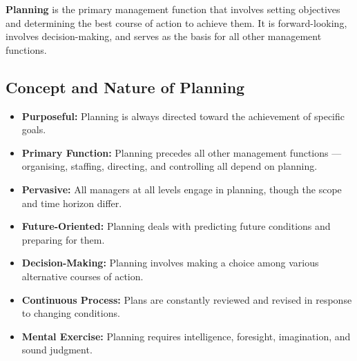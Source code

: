 \documentclass[12pt,a4paper]{article}
\begin{document}
\begin{tcolorbox}[defbox, title={\textbf{Planning --- Definition}}]
\textbf{Planning} is the primary management function that involves setting objectives and determining the best course of action to achieve them. It is forward-looking, involves decision-making, and serves as the basis for all other management functions.
\end{tcolorbox}

\subsection{Concept and Nature of Planning}
\begin{itemize}[leftmargin=*, itemsep=3pt]
  \item \textbf{Purposeful:} Planning is always directed toward the achievement of specific goals.
  \item \textbf{Primary Function:} Planning precedes all other management functions --- organising, staffing, directing, and controlling all depend on planning.
  \item \textbf{Pervasive:} All managers at all levels engage in planning, though the scope and time horizon differ.
  \item \textbf{Future-Oriented:} Planning deals with predicting future conditions and preparing for them.
  \item \textbf{Decision-Making:} Planning involves making a choice among various alternative courses of action.
  \item \textbf{Continuous Process:} Plans are constantly reviewed and revised in response to changing conditions.
  \item \textbf{Mental Exercise:} Planning requires intelligence, foresight, imagination, and sound judgment.
\end{itemize}
\end{document}
